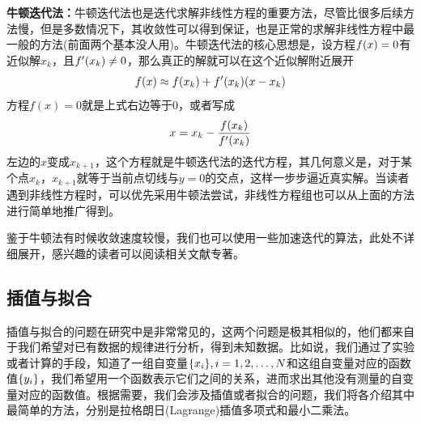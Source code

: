 \documentclass[12pt,a4paper,openany,twoside]{book}
\numberwithin{equation}{section}
\begin{document}
          \textbf{牛顿迭代法：}牛顿迭代法也是迭代求解非线性方程的重要方法，尽管比很多后续方法慢，但是多数情况下，其收敛性可以得到保证，也是正常的求解非线性方程中最一般的方法(前面两个基本没人用)。牛顿迭代法的核心思想是，设方程$f\qty(x)=0$有近似解$x_k$，且$f'\qty(x_k)\neq0$，那么真正的解就可以在这个近似解附近展开
          \begin{equation*}
            f(x)\approx f\qty(x_k)+f'\qty(x_k)\qty(x-x_k)
          \end{equation*}
          方程$f(x)=0$就是上式右边等于0，或者写成
          \begin{equation*}
            x=x_k-\frac{f\qty(x_k)}{f'\qty(x_k)}
          \end{equation*}
          左边的$x$变成$x_{k+1}$，这个方程就是牛顿迭代法的迭代方程，其几何意义是，对于某个点$x_k$，$x_{k+1}$就等于当前点切线与$y=0$的交点，这样一步步逼近真实解。当读者遇到非线性方程时，可以优先采用牛顿法尝试，非线性方程组也可以从上面的方法进行简单地推广得到。

          鉴于牛顿法有时候收敛速度较慢，我们也可以使用一些加速迭代的算法，此处不详细展开，感兴趣的读者可以阅读相关文献专著。
        \subsection{插值与拟合}
          插值与拟合的问题在研究中是非常常见的，这两个问题是极其相似的，他们都来自于我们希望对已有数据的规律进行分析，得到未知数据。比如说，我们通过了实验或者计算的手段，知道了一组自变量$\qty{x_i},i=1,2,\dots,N$和这组自变量对应的函数值$\qty{y_i}$，我们希望用一个函数表示它们之间的关系，进而求出其他没有测量的自变量对应的函数值。根据需要，我们会涉及插值或者拟合的问题，我们将各介绍其中最简单的方法，分别是拉格朗日(Lagrange)插值多项式和最小二乘法。
\end{document}
